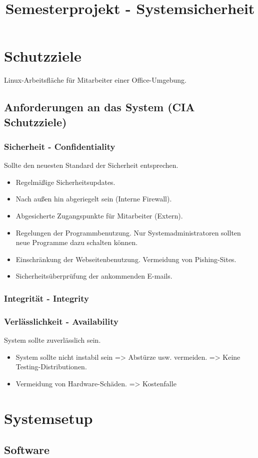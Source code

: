\documentclass[fontsize=12pt]{scrreprt}
\title{Semesterprojekt - Systemsicherheit}
\begin{document}
	
	\tableofcontents
	\chapter{Schutzziele}
	Linux-Arbeitsfläche für Mitarbeiter einer Office-Umgebung.\newline
	
	\section{Anforderungen an das System (CIA Schutzziele)}
	\subsection{Sicherheit - Confidentiality}
	Sollte den neuesten Standard der Sicherheit entsprechen.
	\begin{itemize}
		\item Regelmäßige Sicherheitsupdates.
		\item Nach außen hin abgeriegelt sein (Interne Firewall).
		\item Abgesicherte Zugangspunkte für Mitarbeiter (Extern).
		\item Regelungen der Programmbenutzung. Nur Systemadministratoren sollten neue Programme dazu schalten können.
		\item Einschränkung der Webseitenbenutzung. Vermeidung von Pishing-Sites.
		\item Sicherheitsüberprüfung der ankommenden E-mails.
	\end{itemize}
	\subsection{Integrität - Integrity}
	\subsection{Verlässlichkeit - Availability}
	System sollte zuverlässlich sein.
	\begin{itemize}
		\item System sollte nicht instabil sein => Abstürze usw. vermeiden. => Keine Testing-Distributionen.
		\item Vermeidung von Hardware-Schäden. => Kostenfalle
	\end{itemize}
	\chapter{Systemsetup}
	\section{Software}
\end{document}
